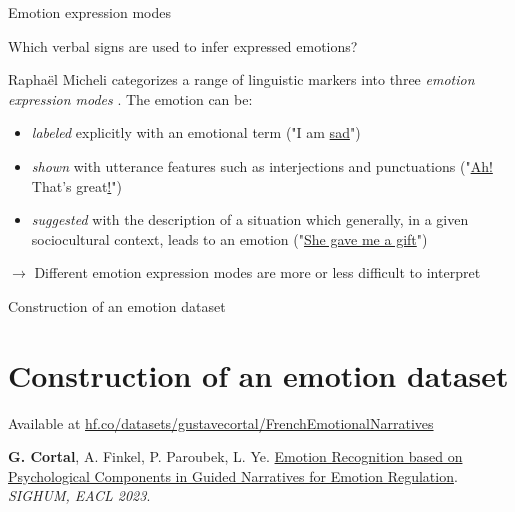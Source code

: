 \documentclass[handout,10pt]{beamer}
\begin{document}
\begin{frame}{Emotion expression modes}

Which verbal signs are used to infer expressed emotions?

\pause
\vspace{0.5cm}

Raphaël Micheli categorizes a range of linguistic markers into three \textit{emotion expression modes} \citep{micheliEsquisseDuneTypologie2013}. The emotion can be: 

\pause
\vspace{0.5cm}

\begin{itemize}[<+->]
    \item \textit{labeled} explicitly with an emotional term ("I am \underline{sad}")
    \item \textit{shown} with utterance features such as interjections and punctuations ("\underline{Ah!} That's great\underline{!}")
    \item \textit{suggested} with the description of a situation which generally, in a given sociocultural context, leads to an emotion ("\underline{She gave me a gift}")
\end{itemize}

\pause
\vspace{0.5cm}

$\rightarrow$ Different emotion expression modes are more or less difficult to interpret
\end{frame}

\begin{frame}{}
\Large
\begin{center}
    Construction of an emotion dataset
    \section{Construction of an emotion dataset}

    \vspace{1.5cm}
\end{center}

\small
Available at \href{https://huggingface.co/datasets/gustavecortal/FrenchEmotionalNarratives}{hf.co/datasets/gustavecortal/FrenchEmotionalNarratives}

\vspace{0.5cm}

\textbf{G. Cortal}, A. Finkel, P. Paroubek, L. Ye. \href{https://aclanthology.org/2023.latechclfl-1.8/}{Emotion Recognition based on Psychological Components in Guided Narratives for Emotion Regulation}. \textit{SIGHUM, EACL 2023}.%
\end{frame}
\end{document}
